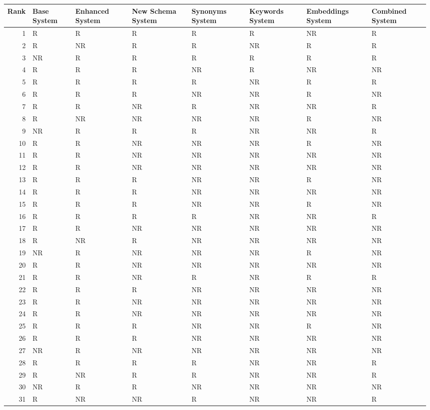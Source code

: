 \begin{tabular}{rlllllll}
\toprule
Rank & Base System & Enhanced System & New Schema System & Synonyms System & Keywords System & Embeddings System & Combined System \\
\midrule
1 & R & R & R & R & R & NR & R \\
2 & R & NR & R & R & NR & R & R \\
3 & NR & R & R & R & R & R & R \\
4 & R & R & R & NR & R & NR & NR \\
5 & R & R & R & R & NR & R & R \\
6 & R & R & R & NR & NR & R & NR \\
7 & R & R & NR & R & NR & NR & R \\
8 & R & NR & NR & NR & NR & R & NR \\
9 & NR & R & R & R & NR & NR & R \\
10 & R & R & NR & NR & NR & R & NR \\
11 & R & R & NR & NR & NR & NR & NR \\
12 & R & R & NR & NR & NR & NR & NR \\
13 & R & R & R & NR & NR & R & NR \\
14 & R & R & R & NR & NR & NR & NR \\
15 & R & R & R & NR & NR & R & NR \\
16 & R & R & R & R & NR & NR & R \\
17 & R & R & NR & NR & NR & NR & NR \\
18 & R & NR & R & NR & NR & NR & NR \\
19 & NR & R & NR & NR & NR & R & NR \\
20 & R & R & NR & NR & NR & NR & NR \\
21 & R & R & NR & R & NR & R & R \\
22 & R & R & R & NR & NR & NR & NR \\
23 & R & R & NR & NR & NR & NR & NR \\
24 & R & R & NR & NR & NR & NR & NR \\
25 & R & R & R & NR & NR & R & NR \\
26 & R & R & R & NR & NR & NR & NR \\
27 & NR & R & NR & NR & NR & NR & NR \\
28 & R & R & R & R & NR & NR & R \\
29 & R & NR & R & R & NR & NR & R \\
30 & NR & R & R & NR & NR & NR & NR \\
31 & R & NR & NR & R & NR & NR & R \\

\end{tabular}
